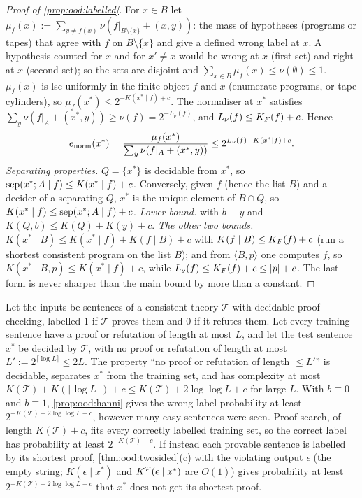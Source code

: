 \begin{proof}[Proof of \cref{prop:ood:labelled}]
For $x\in B$ let $\mu_f(x):=\sum_{y\ne f(x)}\nu(f|_{B\setminus\{x\}}+(x,y))$: the mass of hypotheses (programs or tapes) that agree with $f$ on $B\setminus\{x\}$ and give a defined wrong label at $x$. A hypothesis counted for $x$ and for $x'\ne x$ would be wrong at $x$ (first set) and right at $x$ (second set); so the sets are disjoint and $\sum_{x\in B}\mu_f(x)\le\nu(\emptyset)\le1$. $\mu_f(x)$ is lsc uniformly in the finite object $f$ and $x$ (enumerate programs, or tape cylinders), so $\mu_f(x^*)\le2^{-K(x^*\mid f)+c}$. The normaliser at $x^*$ satisfies $\sum_y\nu(f|_A+(x^*,y))\ge\nu(f)=2^{-L_\nu(f)}$, and $L_\nu(f)\le K_{F}(f)+c$. Hence
\[ e_{\rm norm}(x^*)=\frac{\mu_f(x^*)}{\sum_y\nu(f|_A+(x^*,y))}\le2^{L_\nu(f)-K(x^*\mid f)+c}. \]
\emph{Separating properties.} $Q=\{x^*\}$ is decidable from $x^*$, so $\operatorname{sep}(x^*;A\mid f)\le K(x^*\mid f)+c$. Conversely, given $f$ (hence the list $B$) and a decider of a separating $Q$, $x^*$ is the unique element of $B\cap Q$, so $K(x^*\mid f)\le\operatorname{sep}(x^*;A\mid f)+c$.
\emph{Lower bound.}  with $b\equiv y$ and $K(Q,b)\le K(Q)+K(y)+c$.
\emph{The other two bounds.} $K(x^*\mid B)\le K(x^*\mid f)+K(f\mid B)+c$ with $K(f\mid B)\le K_{F}(f)+c$ (run a shortest consistent program on the list $B$); and from $\langle B,p\rangle$ one computes $f$, so $K(x^*\mid B,p)\le K(x^*\mid f)+c$, while $L_\nu(f)\le K_{F}(f)+c\le|p|+c$. The last form is never sharper than the main bound by more than a constant.
\end{proof}

\begin{example}\label{ex:ood:easyhard}
Let the inputs be sentences of a consistent theory $\mathcal T$ with decidable proof checking, labelled $1$ if $\mathcal T$ proves them and $0$ if it refutes them. Let every training sentence have a proof or refutation of length at most $L$, and let the test sentence $x^*$ be decided by $\mathcal T$, with no proof or refutation of length at most $L':=2^{\lceil\log L\rceil}\le2L$. The property ``no proof or refutation of length $\le L'$'' is decidable, separates $x^*$ from the training set, and has complexity at most $K(\mathcal T)+K(\lceil\log L\rceil)+c\le K(\mathcal T)+2\log\log L+c$ for large $L$. With $b\equiv0$ and $b\equiv1$, \cref{prop:ood:hanni} gives the wrong label probability at least $2^{-K(\mathcal T)-2\log\log L-c}$, however many easy sentences were seen. Proof search, of length $K(\mathcal T)+c$, fits every correctly labelled training set, so the correct label has probability at least $2^{-K(\mathcal T)-c}$. If instead each provable sentence is labelled by its shortest proof, \cref{thm:ood:twosided}(c) with the violating output $\epsilon$ (the empty string; $K(\epsilon\mid x^*)$ and $K^{\mathcal{P}}(\epsilon\mid x^*)$ are $O(1)$) gives probability at least $2^{-K(\mathcal T)-2\log\log L-c}$ that $x^*$ does not get its shortest proof.
\end{example}

